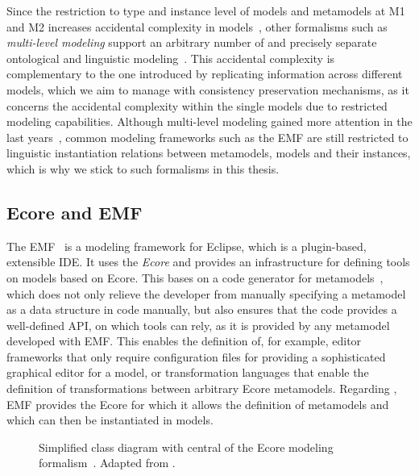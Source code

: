 Since the restriction to type and instance level of models and metamodels at M1 and M2 increases accidental complexity in models~\cite{atkinson2008reducingAccidentalComplexity-SoSym}, other formalisms such as \emph{multi-level modeling} support an arbitrary number of \metalevels and precisely separate ontological and linguistic modeling~\cite{atkinson2003mdd-Software}.
This accidental complexity is complementary to the one introduced by replicating information across different models, which we aim to manage with consistency preservation mechanisms, as it concerns the accidental complexity within the single models due to restricted modeling capabilities.
Although multi-level modeling gained more attention in the last years~\cite{atkinson2014multilevel-MLM}, common modeling frameworks such as the \acrlong{EMF} are still restricted to linguistic instantiation relations between metamodels, models and their instances, which is why we stick to such formalisms in this thesis.


\subsection{Ecore and EMF}
\label{chap:foundations:formalisms:ecore}

The \gls{EMF}~\cite{steinberg2009emf} is a modeling framework for Eclipse, which is a plugin-based, extensible \gls{IDE}.
It uses the \metametamodel \emph{Ecore} and provides an infrastructure for defining tools on models based on Ecore.
This bases on a code generator for metamodels~\cite[pp.~237]{steinberg2009emf}, which does not only relieve the developer from manually specifying a metamodel as a data structure in code manually, but also ensures that the code provides a well-defined \gls{API}, on which tools can rely, as it is provided by any metamodel developed with \gls{EMF}.
This enables the definition of, for example, editor frameworks that only require configuration files for providing a sophisticated graphical editor for a model, or transformation languages that enable the definition of transformations between arbitrary Ecore metamodels.
Regarding \metalevels, \gls{EMF} provides the Ecore \metametamodel for which it allows the definition of metamodels and which can then be instantiated in models.

\begin{figure}
    \centering
    
    \caption[Relevant subset of the Ecore modeling formalism]{Simplified class diagram with central \metaclasses of the Ecore modeling formalism~\cite[p.~107]{steinberg2009emf}. Adapted from \cite[Fig. 2.3]{kramer2017a}.}
    \label{fig:foundations:ecore}
\end{figure}

